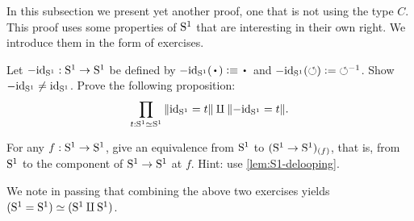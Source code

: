 In this subsection we present yet another proof, one that is not using the type $C$. 
This proof uses some properties of ${\mathrm{S}^1}$ that are interesting in their own right.
We introduce them in the form of exercises.

\begin{xca}\label{xca:S1=S1-components}
Let $-\mathord{\mathrm{id}}_{\mathrm{S}^1} : {\mathrm{S}^1}\to{\mathrm{S}^1}$ be defined by $-\id_\Sc(\base)\defeq\base$ 
and $-\mathord{\mathrm{id}}_{\mathrm{S}^1}(\circlearrowleft)\mathrel{\vcentcolon=}{\circlearrowleft}^{-1}$. Show $-\mathord{\mathrm{id}}_{\mathrm{S}^1} \neq \mathord{\mathrm{id}}_{\mathrm{S}^1}$.
Prove the following proposition:
\[
\prod_{t:{\mathrm{S}^1}\simeq{\mathrm{S}^1}}{\lVert\mathord{\mathrm{id}}_{\mathrm{S}^1} = t\rVert\amalg \lVert-\mathord{\mathrm{id}}_{\mathrm{S}^1} = t\rVert}.
\]
\end{xca}

\begin{xca}\label{xca:(S1->S1)_(f)-eqv-S1}
For any $f: {\mathrm{S}^1}\to{\mathrm{S}^1}$, give an equivalence
from ${\mathrm{S}^1}$ to $({\mathrm{S}^1}\to{\mathrm{S}^1})_{(f)}$, that is, from ${\mathrm{S}^1}$ to
the component of ${\mathrm{S}^1}\to{\mathrm{S}^1}$ at $f$.
Hint: use \cref{lem:S1-delooping}.
\end{xca}

We note in passing that combining the above two exercises 
yields $({\mathrm{S}^1}={\mathrm{S}^1})\simeq({\mathrm{S}^1}\amalg{\mathrm{S}^1})$.

